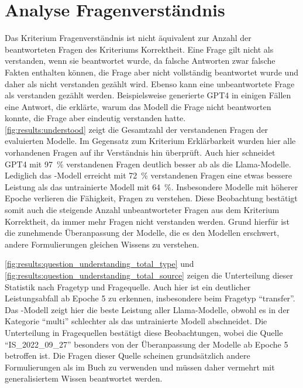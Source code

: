 \section{Analyse Fragenverständnis}\label{sec:results:questionunderstanding}
Das Kriterium Fragenverständnis ist nicht äquivalent zur Anzahl der beantworteten Fragen des Kriteriums Korrektheit.
Eine Frage gilt nicht als verstanden, wenn sie beantwortet wurde, da falsche Antworten zwar falsche Fakten enthalten können, die Frage aber nicht vollständig beantwortet wurde und daher als nicht verstanden gezählt wird.
Ebenso kann eine unbeantwortete Frage als verstanden gezählt werden.
Beispielsweise generierte GPT4 in einigen Fällen eine Antwort, die erklärte, warum das Modell die Frage nicht beantworten konnte, die Frage aber eindeutig verstanden hatte.\\

\cref{fig:results:understood} zeigt die Gesamtzahl der verstandenen Fragen der evaluierten Modelle.
Im Gegensatz zum Kriterium Erklärbarkeit wurden hier alle vorhandenen Fragen auf ihr Verständnis hin überprüft.
Auch hier schneidet GPT4 mit \SI{97}{\percent} verstandenen Fragen deutlich besser ab als die Llama-Modelle.
Lediglich das \lea-Modell erreicht mit \SI{72}{\percent} verstandenen Fragen eine etwas bessere Leistung als das untrainierte Modell mit \SI{64}{\percent}.
Insbesondere Modelle mit höherer Epoche verlieren die Fähigkeit, Fragen zu verstehen.
Diese Beobachtung bestätigt somit auch die steigende Anzahl unbeantworteter Fragen aus dem Kriterium Korrektheit, da immer mehr Fragen nicht verstanden werden.
Grund hierfür ist die zunehmende Überanpassung der Modelle, die es den Modellen erschwert, andere Formulierungen gleichen Wissens zu verstehen.\\


\cref{fig:results:question_understanding_total_type} und \cref{fig:results:question_understanding_total_source} zeigen die Unterteilung dieser Statistik nach Fragetyp und Fragequelle.
Auch hier ist ein deutlicher Leistungsabfall ab Epoche 5 zu erkennen, insbesondere beim Fragetyp \enquote{transfer}. Das \lea-Modell zeigt hier die beste Leistung aller Llama-Modelle, obwohl es in der Kategorie \enquote{multi} schlechter als das untrainierte Modell abschneidet.
Die Unterteilung in Fragequellen bestätigt diese Beobachtungen, wobei die Quelle \enquote{IS\_2022\_09\_27} besonders von der Überanpassung der Modelle ab Epoche 5 betroffen ist.
Die Fragen dieser Quelle scheinen grundsätzlich andere Formulierungen als im Buch zu verwenden und müssen daher vermehrt mit generalisiertem Wissen beantwortet werden.

